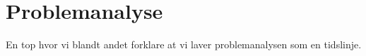 \section{Problemanalyse}
En top hvor vi blandt andet forklare at vi laver problemanalysen som en tidslinje.











\newpage